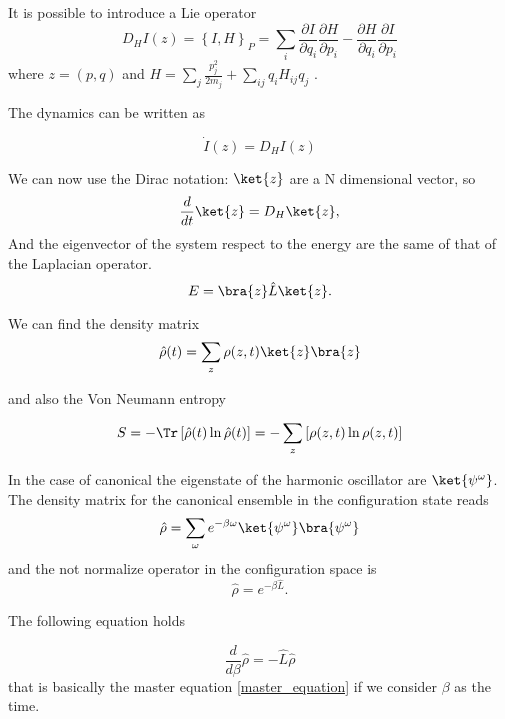 It is possible to introduce a Lie operator 
\begin{equation}
    D_H I(z) =\left\{I,H\right\}_P = \sum_i\frac{\partial I}{\partial q_i}\frac{\partial H}{\partial p_i} - \frac{\partial H}{\partial q_i} \frac{\partial I}{\partial p_i} 
\end{equation}
where $z = (p,q)$ and $H = \sum_j \frac{p_j^2}{2m_j} + \sum_{ij} q_iH_{ij}q_j$ .

The dynamics can be written as 

\begin{equation}
    \dot I (z) = D_H I(z)
\end{equation}

We can now use the Dirac notation: $\ket{z}$ are a N dimensional vector, so
\begin{equation}
    \frac{d}{dt} \ket{z} = D_H \ket{z},
\end{equation}
And the eigenvector of the system respect to the energy are the same of that of the Laplacian operator. 
\begin{equation}
    E = \bra{z}\hat L\ket{z}.
\end{equation}

We can find the density matrix
\begin{equation}
    \hat \rho(t)= \sum_z \rho(z,t) \ket{z}\bra{z}
\end{equation}

and also the Von Neumann entropy 

\begin{equation}
    S = - \Tr \left[\hat\rho(t) \ln \hat\rho(t) \right] =- \sum_z\left[\rho(z,t) \ln\rho(z,t) \right]
\end{equation}

In the case of canonical the eigenstate of the harmonic oscillator are $\ket{\psi^\omega}$. The density matrix for the canonical ensemble in the configuration state reads
\begin{equation}
    \hat\rho = \sum_\omega e^{-\beta \omega} \ket{\psi^\omega}\bra{\psi^\omega}
\end{equation}
and the not normalize operator in the configuration space is
\begin{equation}
    \hat\rho = e^{-\beta \hat L}.
\end{equation}

The following equation holds

\begin{equation}
    \frac{d}{d\beta} \hat\rho = - \hat L \hat \rho
\end{equation}
that is basically the master equation \ref{master_equation} if we consider $\beta$ as the time.

